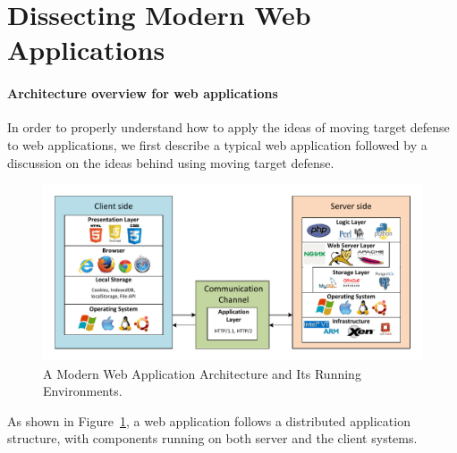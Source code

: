 \section{Dissecting Modern Web Applications}
\paragraph{Architecture overview for web applications}
In order to properly understand how to apply the ideas of moving
target defense to web applications, we first describe a typical web application followed by a discussion on the ideas behind using moving target defense.
\begin{figure}[tb]
	\centering
	\includegraphics[width=.95\linewidth]{Web_App_Architecture}
	\caption{A Modern Web Application Architecture and Its Running Environments.}
	\label{fig:webapparch}
\end{figure}
As shown in Figure~\ref{fig:webapparch}, a web application follows a
distributed application structure, with components running on both
server and the client systems.

